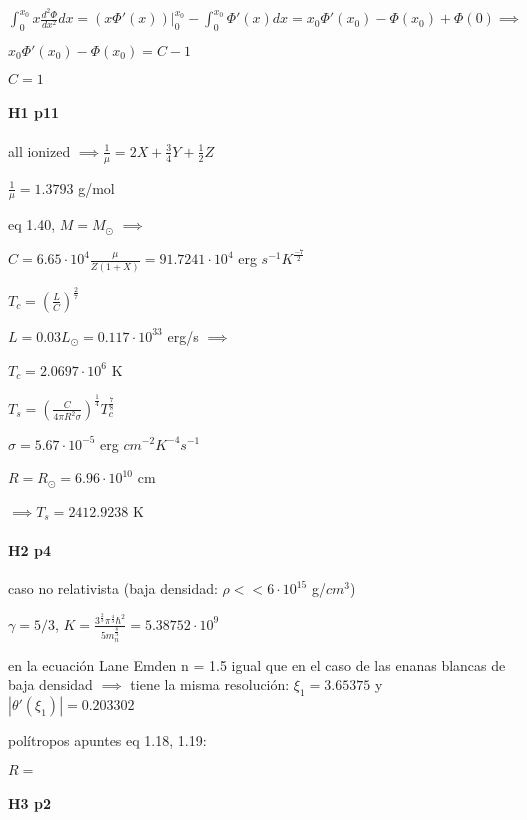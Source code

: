 \documentclass[12pt]{book}
\begin{document}
$\int_0^{x_0}{x \frac{d^2\Phi}{dx^2} dx } = (x \Phi'(x))|_0^{x_0} - \int_0^{x_0}{\Phi'(x) dx } = x_0 \Phi'(x_0) - \Phi(x_0) + \Phi(0) \implies$

$x_0 \Phi'(x_0) - \Phi(x_0) = C - 1$

$C = 1$ 

\paragraph{H1 p11}


all ionized $\implies \frac{1}{\mu} = 2 X + \frac{3}{4} Y + \frac{1}{2} Z$

$\frac{1}{\mu}  = 1.3793$ g/mol

eq 1.40, $M = M_{\odot}$ $\implies$

$C = 6.65 \cdot 10^4 \frac{\mu}{Z(1+X)} = 91.7241 \cdot 10^4$ erg $s^{-1} K^{\frac{-7}{2}}$ 

$T_c = (\frac{L}{C})^{\frac{2}{7}}$

$L = 0.03 L_{\odot} = 0.117 \cdot 10^{33} $ erg/s $\implies$

$T_c = 2.0697 \cdot 10^6$ K

$T_s = (\frac{C}{4 \pi R^2 \sigma})^{\frac{1}{4}} T_c^{\frac{7}{8}}$

$\sigma = 5.67 \cdot 10^{-5}$ erg $cm^{-2} K^{-4} s^{-1}$

$R = R_{\odot} = 6.96 \cdot 10^{10}$ cm

$\implies T_s = 2412.9238$ K


\paragraph{H2 p4}

caso no relativista (baja densidad: $\rho << 6  \cdot 10^{15} $ g/$cm^3$)

$\gamma = 5/3$, $K = \frac{3^{\frac{2}{3}} \pi^{\frac{4}{3}} \hbar^2 }{5 m_n^{\frac{8}{3}}} = 5.38752 \cdot 10^9$

en la ecuación Lane Emden n = 1.5 igual que en el caso de las enanas blancas  de baja densidad $\implies $ tiene la misma resolución:
$\xi_1= 3.65375$ y $|\theta'(\xi_1)|= 0.203302$  

polítropos apuntes eq 1.18, 1.19:

$R = $


\paragraph{H3 p2}
\end{document}
